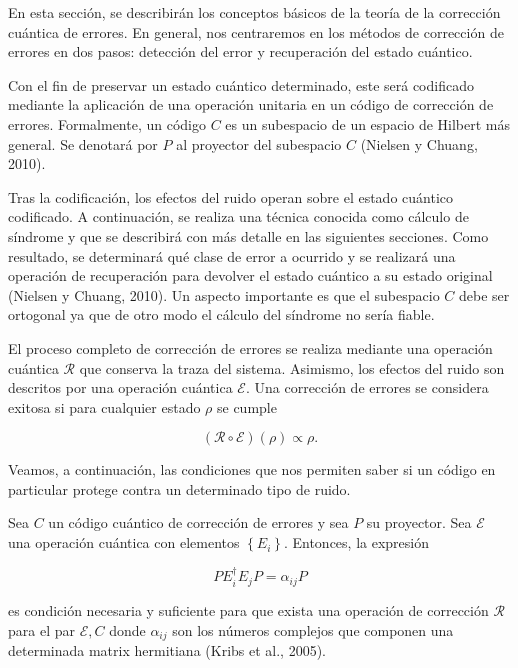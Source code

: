 En esta sección, se describirán los conceptos básicos de la teoría de la corrección cuántica de errores. En general, nos centraremos en los métodos de corrección de errores en dos pasos: detección del error y recuperación del estado cuántico. 

Con el fin de preservar un estado cuántico determinado, este será codificado mediante la aplicación de una operación unitaria en un código de corrección de errores. Formalmente, un código $C$ es un subespacio de un espacio de Hilbert más general. Se denotará por $P$ al proyector del subespacio $C$ (Nielsen y Chuang, 2010). 

Tras la codificación, los efectos del ruido operan sobre el estado cuántico codificado. A continuación, se realiza una técnica conocida como cálculo de síndrome y que se describirá con más detalle en las siguientes secciones. Como resultado, se determinará qué clase de error a ocurrido y se realizará una operación de recuperación para devolver el estado cuántico a su estado original (Nielsen y Chuang, 2010). Un aspecto importante es que el subespacio $C$ debe ser ortogonal ya que de otro modo el cálculo del síndrome no sería fiable. 

El proceso completo de corrección de errores se realiza mediante una operación cuántica $\mathcal{R}$ que conserva la traza del sistema. Asimismo, los efectos del ruido son descritos por una operación cuántica $\mathscr{E} $. Una corrección de errores se considera exitosa si para cualquier estado $ \rho$ se cumple 

$$ ( \mathcal{R} \circ \mathscr{E} ) ( \rho ) \propto \rho. $$ 

Veamos, a continuación, las condiciones que nos permiten saber si un código en particular protege contra un determinado tipo de ruido. 

\begin{theorem}

Sea $C$ un código cuántico de corrección de errores y sea $P$ su proyector. Sea 
$\mathscr{E}$ una operación cuántica con elementos $ \left \{ E_i \right \}$. Entonces, la expresión 

$$ P E^{\dagger}_i E_j P = \alpha_{ij} P $$

es condición necesaria y suficiente para que exista una operación de corrección  $\mathcal{R}$ para el par $ \mathscr{E}, C$ donde $\alpha_{ij}$ son los números complejos que componen una determinada matrix hermitiana (Kribs et al., 2005).

\end{theorem}

